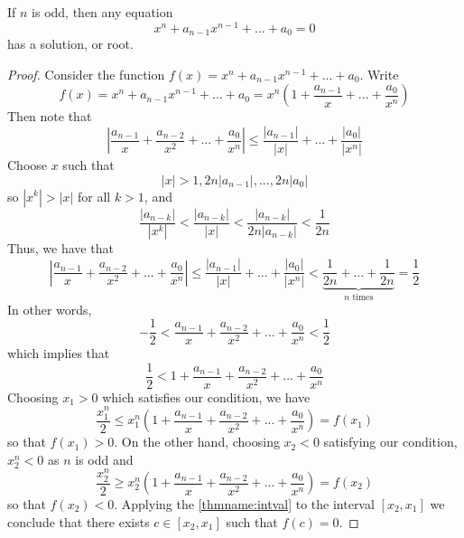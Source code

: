 \begin{cor}
    If $n$ is odd, then any equation \begin{equation}
        x^n + a_{n-1}x^{n-1} + ... + a_0 = 0
    \end{equation}
    has a solution, or root.
\end{cor}
\begin{proof}
    Consider the function $f(x) = x^n+a_{n-1}x^{n-1} + ... + a_0$. Write $$f(x) = x^n+a_{n-1}x^{n-1} + ... + a_0 = x^n\left(1 + \frac{a_{n-1}}{x} + ... + \frac{a_0}{x^n}\right)$$ 
    Then note that $$\left|\frac{a_{n-1}}{x} + \frac{a_{n-2}}{x^2} + ... + \frac{a_0}{x^n}\right|\leq \frac{|a_{n-1}|}{|x|} + ... + \frac{|a_0|}{|x^n|}$$
    Choose $x$ such that $$|x| > 1,2n|a_{n-1}|,...,2n|a_0|$$
    so $|x^k| > |x|$ for all $k > 1$, and $$\frac{|a_{n-k}|}{|x^k|} < \frac{|a_{n-k}|}{|x|} < \frac{|a_{n-k}|}{2n|a_{n-k}|} < \frac{1}{2n}$$
    Thus, we have that $$\left|\frac{a_{n-1}}{x} + \frac{a_{n-2}}{x^2} + ... + \frac{a_0}{x^n}\right|\leq \frac{|a_{n-1}|}{|x|} + ... + \frac{|a_0|}{|x^n|} < \underbrace{\frac{1}{2n} + ... +\frac{1}{2n}}_{\text{$n$ times}} = \frac{1}{2}$$
    In other words, $$-\frac{1}{2} < \frac{a_{n-1}}{x} + \frac{a_{n-2}}{x^2} + ... + \frac{a_0}{x^n} < \frac{1}{2}$$
    which implies that $$\frac{1}{2} < 1 + \frac{a_{n-1}}{x} + \frac{a_{n-2}}{x^2} + ... + \frac{a_0}{x^n}$$
    Choosing $x_1 > 0$ which satisfies our condition, we have $$\frac{x_1^n}{2} \leq x_1^n\left(1+\frac{a_{n-1}}{x} + \frac{a_{n-2}}{x^2} + ... + \frac{a_0}{x^n}\right) = f(x_1)$$
    so that $f(x_1) > 0$. On the other hand, choosing $x_2 < 0$ satisfying our condition, $x_2^n < 0$ as $n$ is odd and $$\frac{x_2^n}{2} \geq x_2^n\left(1+\frac{a_{n-1}}{x} + \frac{a_{n-2}}{x^2} + ... + \frac{a_0}{x^n}\right) = f(x_2)$$
    so that $f(x_2) < 0$. Applying the \ref{thmname:intval} to the interval $[x_2,x_1]$ we conclude that there exists $c \in [x_2,x_1]$ such that $f(c) = 0$.
\end{proof}


